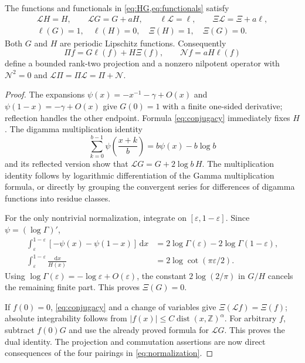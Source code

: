 \documentclass[11pt,a4paper]{article}
\numberwithin{equation}{section}
\theoremstyle{definition}
\theoremstyle{remark}
\newcommand{\ZZ}{\mathbb Z}
\newcommand{\dd}{\,\mathrm d}
\newcommand{\Lop}{\mathcal L}
\newcommand{\Proj}{\Pi}
\newcommand{\dist}{\operatorname{dist}}
\begin{document}
\begin{lemma}
\label{lem:jordan-coordinates}
The functions and functionals in \cref{eq:HG,eq:functionals} satisfy
\begin{gather}
 \Lop H=H,\qquad \Lop G=G+aH,\qquad
 \ell\Lop=\ell,\qquad \Xi\Lop=\Xi+a\ell,\label{eq:jordan-relations}\\
 \ell(G)=1,\quad \ell(H)=0,\quad \Xi(H)=1,\quad \Xi(G)=0.
 \label{eq:normalization}
\end{gather}
Both $G$ and $H$ are periodic Lipschitz functions. Consequently
\begin{equation}
 \Proj f=G\ell(f)+H\Xi(f),\qquad
 \mathcal N f=aH\ell(f)
 \label{eq:PN}
\end{equation}
define a bounded rank-two projection and a nonzero nilpotent operator
with $\mathcal N^2=0$ and
$\Lop\Proj=\Proj\Lop=\Proj+\mathcal N$.
\end{lemma}
\begin{proof}
The expansions $\psi(x)=-x^{-1}-\gamma+O(x)$ and
$\psi(1-x)=-\gamma+O(x)$ give $G(0)=1$ with a finite one-sided derivative;
reflection handles the other endpoint. Formula \cref{eq:conjugacy}
immediately fixes $H$. The digamma multiplication identity
\[
 \sum_{k=0}^{b-1}\psi\left(\frac{x+k}{b}\right)
       =b\psi(x)-b\log b
\]
and its reflected version show that $\Lop G=G+2\log b\,H$.
The multiplication identity follows by logarithmic differentiation of
the Gamma multiplication formula, or directly by grouping the convergent
series for differences of digamma functions into residue classes.

For the only nontrivial normalization, integrate on
$[\varepsilon,1-\varepsilon]$. Since $\psi=(\log\Gamma)'$,
\begin{align*}
 \int_\varepsilon^{1-\varepsilon}
 [-\psi(x)-\psi(1-x)]\dd x
 &=2\log\Gamma(\varepsilon)-2\log\Gamma(1-\varepsilon),\\
 \int_\varepsilon^{1-\varepsilon}\frac{\dd x}{H(x)}
 &=2\log\cot(\pi\varepsilon/2).
\end{align*}
Using $\log\Gamma(\varepsilon)=-\log\varepsilon+O(\varepsilon)$,
the constant $2\log(2/\pi)$ in $G/H$ cancels the remaining finite part.
This proves $\Xi(G)=0$.

If $f(0)=0$, \cref{eq:conjugacy} and a change of variables give
$\Xi(\Lop f)=\Xi(f)$; absolute integrability follows from
$|f(x)|\le C\dist(x,\ZZ)^\alpha$. For arbitrary $f$, subtract $f(0)G$
and use the already proved formula for $\Lop G$. This proves the dual
identity. The projection and commutation assertions are now direct
consequences of the four pairings in \cref{eq:normalization}.
\end{proof}
\end{document}

